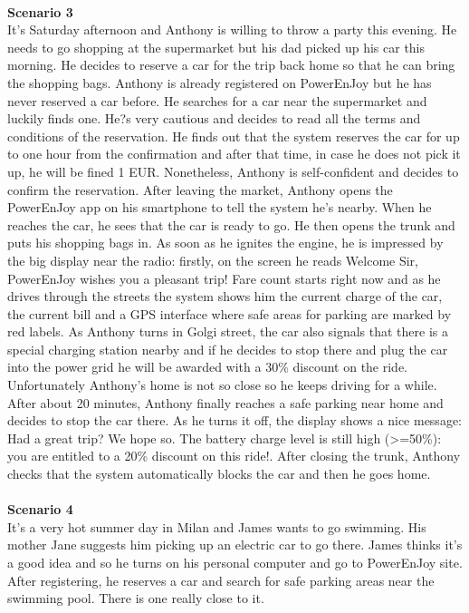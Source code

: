 \documentclass[11pt,a4paper]{report}
\begin{document}
\noindent \\
\textbf{Scenario 3}\\
It's Saturday afternoon and Anthony is willing to throw a party this evening. He needs to go shopping at the supermarket but his dad picked up his car this morning. He decides to reserve a car for the trip back home so that he can bring the shopping bags. Anthony is already registered on PowerEnJoy but he has never reserved a car before. He searches for a car near the supermarket and luckily finds one. He?s very cautious and decides to read all the terms and conditions of the reservation. He finds out that the system reserves the car for up to one hour from the confirmation and after that time, in case he does not pick it up, he will be fined 1 EUR. Nonetheless, Anthony is self-confident and decides to confirm the reservation.
After leaving the market, Anthony opens the PowerEnJoy app on his smartphone to tell the system he's nearby. When he reaches the car, he sees that the car is ready to go. He then opens the trunk and puts his shopping bags in. As soon as he ignites the engine, he is impressed by the big display near the radio: firstly, on the screen he reads Welcome Sir, PowerEnJoy wishes you a pleasant trip! Fare count starts right now and as he drives through the streets the system shows him the current charge of the car, the current bill and a GPS interface where safe areas for parking are marked by red labels. As Anthony turns in Golgi street, the car also signals that there is a special charging station nearby and if he decides to stop there and plug the car into the power grid he will be awarded with a 30\% discount on the ride. Unfortunately Anthony's home is not so close so he keeps driving for a while.
After about 20 minutes, Anthony finally reaches a safe parking near home and decides to stop the car there. As he turns it off, the display shows a nice message: Had a great trip? We hope so. The battery charge level is still high (>=50\%): you are entitled to a 20\% discount on this ride!. After closing the trunk, Anthony checks that the system automatically blocks the car and then he goes home.\\ \noindent \\
\textbf{Scenario 4}\\
It's a very hot summer day in Milan and James wants to go swimming. His mother Jane suggests him picking up an electric car to go there. James thinks it's a good idea and so he turns on his personal computer and go to PowerEnJoy site. After registering, he reserves a car and search for safe parking areas near the swimming pool. There is one really close to it.
\end{document}
